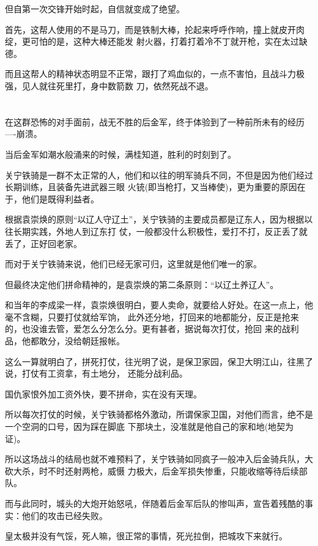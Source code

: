 \documentclass[11pt,a4paper,onecolumn]{article}
\begin{document}
但自第一次交锋开始时起，自信就变成了绝望。

首先，这帮人使用的不是马刀，而是铁制大棒，抡起来呼呼作响，撞上就皮开肉绽，更可怕的是，这种大棒还能发
射火器，打着打着冷不丁就开枪，实在太过缺德。

而且这帮人的精神状态明显不正常，跟打了鸡血似的，一点不害怕，且战斗力极强，见人就往死里打，身中数箭数
刀，依然死战不退。

\section[\thesection]{}

在这群恐怖的对手面前，战无不胜的后金军，终于体验到了一种前所未有的经历----崩溃。

当后金军如潮水般涌来的时候，满桂知道，胜利的时刻到了。

关宁铁骑是一群不太正常的人，他们和以往的明军骑兵不同，不但是因为他们经过长期训练，且装备先进武器三眼
火铳(即当枪打，又当棒使)，更为重要的原因在于，他们是既得利益者。

根据袁崇焕的原则``以辽人守辽土''，关宁铁骑的主要成员都是辽东人，因为根据以往长期实践，外地人到辽东打
仗，一般都没什么积极性，爱打不打，反正丢了就丢了，正好回老家。

而对于关宁铁骑来说，他们已经无家可归，这里就是他们唯一的家。

但最终决定他们拼命精神的，是袁崇焕的第二条原则：``以辽土养辽人''。

和当年的李成梁一样，袁崇焕很明白，要人卖命，就要给人好处。在这一点上，他毫不含糊，只要打仗就给军饷，
此外还分地，打回来的地都能分，反正是抢来的，也没谁去管，爱怎么分怎么分。更有甚者，据说每次打仗，抢回
来的战利品，他都敢分，没给朝廷报帐。

这么一算就明白了，拼死打仗，往光明了说，是保卫家园，保卫大明江山，往黑了说，打仗有工资拿，有土地分，
还能分战利品。

国仇家恨外加工资外快，要不拼命，实在没有天理。

所以每次打仗的时候，关宁铁骑都格外激动，所谓保家卫国，对他们而言，绝不是一个空洞的口号，因为踩在脚底
下那块土，没准就是他自己的家和地(地契为证)。

所以这场战斗的结局也就不难预料了，关宁铁骑如同疯子一般冲入后金骑兵队，大砍大杀，时不时还射两枪，威慑
力极大，后金军损失惨重，只能收缩等待后续部队。

而与此同时，城头的大炮开始怒吼，伴随着后金军后队的惨叫声，宣告着残酷的事实：他们的攻击已经失败。

皇太极并没有气馁，死人嘛，很正常的事情，死光拉倒，把城攻下来就行。
\end{document}

